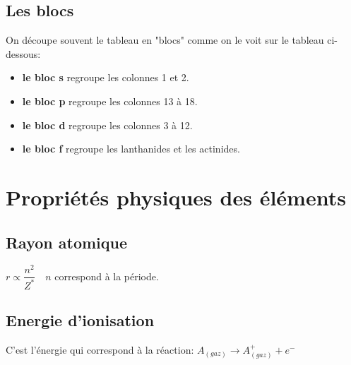 \documentclass{article}
\begin{document}
\subsection{Les blocs}
On découpe souvent le tableau en "blocs" comme on le voit sur le tableau ci-dessous:
\vspace{5mm}

\hspace{0.5cm}\pgfPT[
    CS all=darkgray,    
    csBlocks,
    blocks font color=black,
    cell size=22pt, 
    show blocks, 
    show title=false, 
    show legend=false,
    blocks font=\small,
    name font=\Tiny
    ]

\begin{itemize}[label=$\ast$]
    \item \textbf{le bloc s} regroupe les colonnes 1 et 2.
    \item  \textbf{le bloc p} regroupe les colonnes 13 à 18.
    \item  \textbf{le bloc d} regroupe les colonnes 3 à 12.
    \item  \textbf{le bloc f} regroupe les lanthanides et les actinides.
\end{itemize}




\section{Propriétés physiques des éléments}

\subsection{Rayon atomique}

$ r \propto \dfrac{n^2}{Z^*} \quad n$ correspond à la période.

\vspace{3mm}
\hspace{0cm}\pgfPT[
    Z list=spd,
    CS all=darkgray,    
    csSoft,
    cell size=22pt, 
    show title=false, 
    show legend,
    show legend pins=false,
    name font=\Tiny,
    show periodic variations,
    cell style=pgfPTR,
    varR font=\footnotesize
    ]


\subsection{Energie d'ionisation}

C'est l'énergie qui correspond à la réaction: $A_{(gaz)} \rightarrow A^+_{(gaz)} + e^-$
\end{document}

